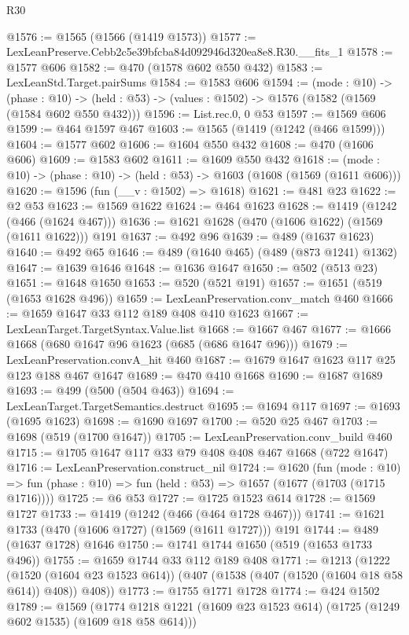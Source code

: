 \begin{lexlean}{R30}
\begin{coremodule}
@1576 := @1565 (@1566 (@1419 @1573))
@1577 := LexLeanPreserve.Cebb2c5e39bfcba84d092946d320ea8e8.R30.__fits_1
@1578 := @1577 @606
@1582 := @470 (@1578 @602 @550 @432)
@1583 := LexLeanStd.Target.pairSums
@1584 := @1583 @606
@1594 := (mode : @10) ->
  (phase : @10) -> (held : @53) -> (values : @1502) -> @1576 (@1582 (@1569 (@1584 @602 @550 @432)))
@1596 := List.rec.{0, 0} @53
@1597 := @1569 @606
@1599 := @464 @1597 @467
@1603 := @1565 (@1419 (@1242 (@466 @1599)))
@1604 := @1577 @602
@1606 := @1604 @550 @432
@1608 := @470 (@1606 @606)
@1609 := @1583 @602
@1611 := @1609 @550 @432
@1618 := (mode : @10) -> (phase : @10) -> (held : @53) -> @1603 (@1608 (@1569 (@1611 @606)))
@1620 := @1596 (fun (__v : @1502) => @1618)
@1621 := @481 @23
@1622 := @2 @53
@1623 := @1569 @1622
@1624 := @464 @1623
@1628 := @1419 (@1242 (@466 (@1624 @467)))
@1636 := @1621 @1628 (@470 (@1606 @1622) (@1569 (@1611 @1622))) @191
@1637 := @492 @96
@1639 := @489 (@1637 @1623)
@1640 := @492 @65
@1646 := @489 (@1640 @465) (@489 (@873 @1241) @1362)
@1647 := @1639 @1646
@1648 := @1636 @1647
@1650 := @502 (@513 @23)
@1651 := @1648 @1650
@1653 := @520 (@521 @191)
@1657 := @1651 (@519 (@1653 @1628 @496))
@1659 := LexLeanPreservation.conv_match @460
@1666 := @1659 @1647 @33 @112 @189 @408 @410 @1623
@1667 := LexLeanTarget.TargetSyntax.Value.list
@1668 := @1667 @467
@1677 := @1666 @1668 (@680 @1647 @96 @1623 (@685 (@686 @1647 @96)))
@1679 := LexLeanPreservation.convA_hit @460
@1687 := @1679 @1647 @1623 @117 @25 @123 @188 @467 @1647
@1689 := @470 @410 @1668
@1690 := @1687 @1689
@1693 := @499 (@500 (@504 @463))
@1694 := LexLeanTarget.TargetSemantics.destruct
@1695 := @1694 @117
@1697 := @1693 (@1695 @1623)
@1698 := @1690 @1697
@1700 := @520 @25 @467
@1703 := @1698 (@519 (@1700 @1647))
@1705 := LexLeanPreservation.conv_build @460
@1715 := @1705 @1647 @117 @33 @79 @408 @408 @467 @1668 (@722 @1647)
@1716 := LexLeanPreservation.construct_nil
@1724 := @1620
    (fun (mode : @10) =>
    fun (phase : @10) => fun (held : @53) => @1657 (@1677 (@1703 (@1715 @1716))))
@1725 := @6 @53
@1727 := @1725 @1523 @614
@1728 := @1569 @1727
@1733 := @1419 (@1242 (@466 (@464 @1728 @467)))
@1741 := @1621 @1733 (@470 (@1606 @1727) (@1569 (@1611 @1727))) @191
@1744 := @489 (@1637 @1728) @1646
@1750 := @1741 @1744 @1650 (@519 (@1653 @1733 @496))
@1755 := @1659 @1744 @33 @112 @189 @408
@1771 := @1213
    (@1222
      (@1520 (@1604 @23 @1523 @614))
      (@407 (@1538 (@407 (@1520 (@1604 @18 @58 @614)) @408)) @408))
@1773 := @1755 @1771 @1728
@1774 := @424 @1502
@1789 := @1569
    (@1774 @1218 @1221 (@1609 @23 @1523 @614) (@1725 (@1249 @602 @1535) (@1609 @18 @58 @614)))

\end{coremodule}
\end{lexlean}
